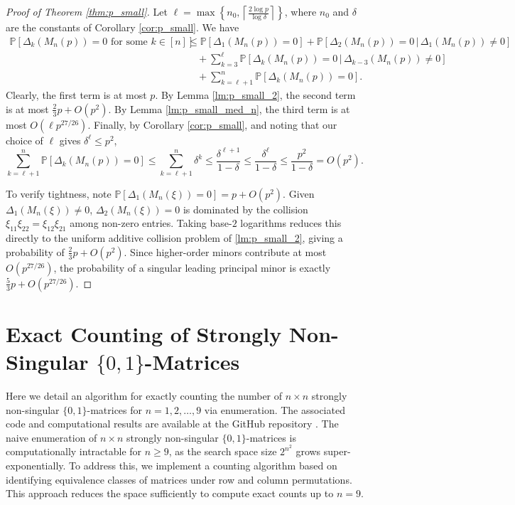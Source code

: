 \documentclass[reqno]{amsart}
\numberwithin{equation}{section}
\begin{document}
\begin{proof}[Proof of Theorem \ref{thm:p_small}]
Let $\ell = \max\left\{n_0, \left\lceil \frac{2 \log p}{\log \delta} \right\rceil \right\}$, where $n_0$ and $\delta$ are the constants of Corollary \ref{cor:p_small}. We have
\begin{align*}
\mathbb{P}\left[ \Delta_k(M_n(p)) = 0 \text{ for some } k \in [n]\right] &\le \mathbb{P} \left[ \Delta_1(M_n(p)) = 0 \right] + \mathbb{P}\left[ \Delta_2(M_n(p)) = 0 \, | \, \Delta_1(M_n(p)) \ne 0 \right]\\
&\quad + \sum_{k=3}^\ell \mathbb{P}\left[ \Delta_k(M_n(p)) = 0 \, | \, \Delta_{k-3}(M_n(p)) \ne 0 \right] \\
&\quad + \sum_{k =\ell+1}^n \mathbb{P} \left[ \Delta_k(M_n(p)) = 0 \right].
\end{align*}
Clearly, the first term is at most $p$. By Lemma \ref{lm:p_small_2}, the second term is at most $\frac{2}{3}p + O(p^2)$. By Lemma \ref{lm:p_small_med_n}, the third term is at most $O(\ell p^{27/26})$. Finally, by Corollary \ref{cor:p_small}, and noting that our choice of $\ell$ gives $\delta^\ell \le p^2$,
\[\sum_{k = \ell+1}^n \mathbb{P} \left[ \Delta_k(M_n(p)) = 0 \right] \le \sum_{k = \ell+1}^n \delta^k \le \frac{\delta^{\ell+1}}{1-\delta} \le \frac{\delta^\ell}{1-\delta} \le \frac{p^2}{1-\delta} = O(p^2).\]

To verify tightness, note $\mathbb{P}[\Delta_1(M_n(\xi)) = 0] = p + O(p^2)$. Given $\Delta_1(M_n(\xi)) \ne 0$, $\Delta_2(M_n(\xi)) = 0$ is dominated by the collision $\xi_{11}\xi_{22} = \xi_{12}\xi_{21}$ among non-zero entries. Taking base-$2$ logarithms reduces this directly to the uniform additive collision problem of \cref{lm:p_small_2}, giving a probability of $\frac{2}{3}p + O(p^2)$. Since higher-order minors contribute at most $O(p^{27/26})$, the probability of a singular leading principal minor is exactly $\frac{5}{3}p + O(p^{27/26})$.
\end{proof}



\section{Exact Counting of Strongly Non-Singular $\{0,1\}$-Matrices}
\label{sec:sns}

Here we detail an algorithm for exactly counting the number of $n \times n$ strongly non-singular $\{0,1\}$-matrices for $n = 1,2,\ldots,9$ via enumeration. The associated code and computational results are available at the GitHub repository \cite{OrellanaMateo2026Repo}. The naive enumeration of $n \times n$ strongly non-singular $\{0,1\}$-matrices is computationally intractable for $n \ge 9$, as the search space size $2^{n^2}$ grows super-exponentially. To address this, we implement a counting algorithm based on identifying equivalence classes of matrices under row and column permutations. This approach reduces the space sufficiently to compute exact counts up to $n=9$.
\end{document}
